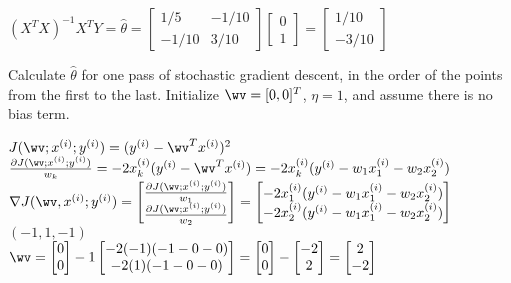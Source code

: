 \begin{parts}
\begin{subparts}
\begin{soln}
     $(X^T X)^{-1}X^T Y = \hat{\theta} =
     \begin{bmatrix}
     1/5 & -1/10\\
     -1/10 & 3/10
     \end{bmatrix}
     \begin{bmatrix}
     0 \\
     1
     \end{bmatrix}
     = \boxed{\begin{bmatrix}
     1/10\\
     -3/10
     \end{bmatrix}}$
    \end{soln}
    
    \subpart[5] Calculate $\hat{\theta}$ for one pass of stochastic gradient descent, in the order of the points from the first to the last. Initialize $\wv = [0,0]^T$, $\eta = 1$, and assume there is no bias term.
    
    \begin{soln}
    $J(\wv; x^{(i)}; y^{(i)}) = (y^{(i)}-\wv^T x^{(i)})^2$\\[0.1 in]
    $\frac{\partial J(\wv; x^{(i)}; y^{(i)})}{w_k} = -2x_k^{(i)}(y^{(i)} - \wv^T x^{(i)}) = -2x_k^{(i)}(y^{(i)} - w_1x_1^{(i)} - w_2x_2^{(i)})$\\[0.1 in]
    $\nabla J(\wv, x^{(i)}; y^{(i)}) = \begin{bmatrix}
    \frac{\partial J(\wv; x^{(i)}; y^{(i)})}{w_1} \\
    \frac{\partial J(\wv; x^{(i)}; y^{(i)})}{w_2}
    \end{bmatrix} = \begin{bmatrix}
    -2x_1^{(i)}(y^{(i)} - w_1x_1^{(i)} - w_2x_2^{(i)}) \\
    -2x_2^{(i)}(y^{(i)} - w_1x_1^{(i)} - w_2x_2^{(i)})
    \end{bmatrix}$\\
    
    $(-1, 1, -1)$\\[0.05 in]
    $\wv = \begin{bmatrix}
    0 \\ 0
    \end{bmatrix} - 1 \begin{bmatrix}
    -2(-1)(-1-0-0) \\
    -2(1)(-1-0-0)
    \end{bmatrix} = \begin{bmatrix}
    0 \\ 0
    \end{bmatrix} - \begin{bmatrix}
    -2 \\ 2
    \end{bmatrix} = 
    \begin{bmatrix}
    2 \\ -2
    \end{bmatrix}$\\
    

\end{soln}
\end{subparts}
\end{parts}
